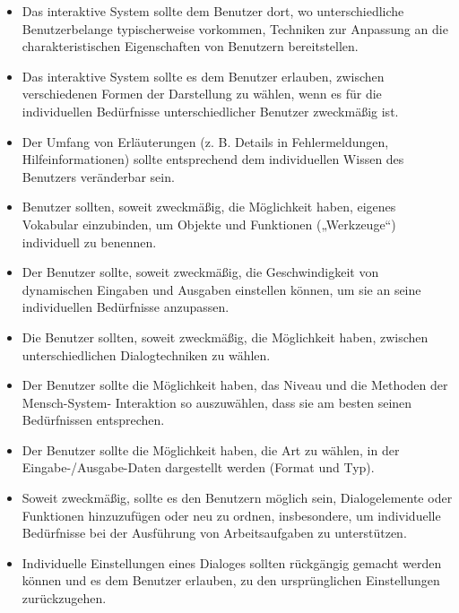 \begin{itemize}
	\item Das interaktive System sollte dem Benutzer dort, wo unterschiedliche Benutzerbelange typischerweise
	vorkommen, Techniken zur Anpassung an die charakteristischen Eigenschaften von Benutzern
	bereitstellen.
	\item Das interaktive System sollte es dem Benutzer erlauben, zwischen verschiedenen Formen der
	Darstellung zu wählen, wenn es für die individuellen Bedürfnisse unterschiedlicher Benutzer zweckmäßig ist.
	\item Der Umfang von Erläuterungen (z. B. Details in Fehlermeldungen, Hilfeinformationen) sollte
	entsprechend dem individuellen Wissen des Benutzers veränderbar sein.
	\item Benutzer sollten, soweit zweckmäßig, die Möglichkeit haben, eigenes Vokabular einzubinden, um
	Objekte und Funktionen („Werkzeuge“) individuell zu benennen.
	\item Der Benutzer sollte, soweit zweckmäßig, die Geschwindigkeit von dynamischen Eingaben und
	Ausgaben einstellen können, um sie an seine individuellen Bedürfnisse anzupassen.
	\item Die Benutzer sollten, soweit zweckmäßig, die Möglichkeit haben, zwischen unterschiedlichen
	Dialogtechniken zu wählen.
	\item Der Benutzer sollte die Möglichkeit haben, das Niveau und die Methoden der Mensch-System-
	Interaktion so auszuwählen, dass sie am besten seinen Bedürfnissen entsprechen.
	\item Der Benutzer sollte die Möglichkeit haben, die Art zu wählen, in der Eingabe-/Ausgabe-Daten
	dargestellt werden (Format und Typ).
	\item Soweit zweckmäßig, sollte es den Benutzern möglich sein, Dialogelemente oder Funktionen
	hinzuzufügen oder neu zu ordnen, insbesondere, um individuelle Bedürfnisse bei der Ausführung von
	Arbeitsaufgaben zu unterstützen.
	\item Individuelle Einstellungen eines Dialoges sollten rückgängig gemacht werden können und es dem
	Benutzer erlauben, zu den ursprünglichen Einstellungen zurückzugehen.
\end{itemize}
\newpage
